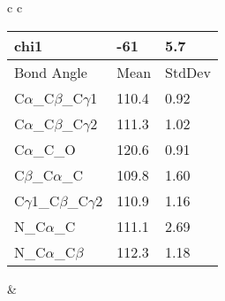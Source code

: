 \begin{longtable}{ c c }
\begin{tabular}{ l l l }
  chi1 & -61 & 5.7 \\ \midrule
  Bond Angle   & Mean     & StdDev \\ \midrule
  C$\alpha$\_C$\beta$\_C$\gamma$1 & 110.4 & 0.92\\
  C$\alpha$\_C$\beta$\_C$\gamma$2 & 111.3 & 1.02\\
  C$\alpha$\_C\_O & 120.6 & 0.91\\
  C$\beta$\_C$\alpha$\_C & 109.8 & 1.60\\
  C$\gamma$1\_C$\beta$\_C$\gamma$2 & 110.9 & 1.16\\
  N\_C$\alpha$\_C & 111.1 & 2.69\\
  N\_C$\alpha$\_C$\beta$ & 112.3 & 1.18\\
  \bottomrule
  \end{tabular}
  &
  \\
  
\end{longtable}

\newpage

